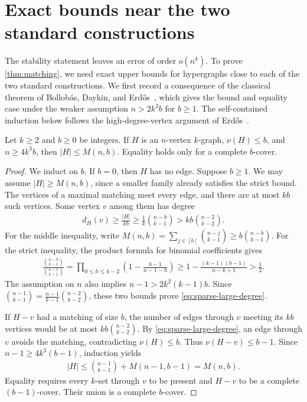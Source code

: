 \section{Exact bounds near the two standard constructions}\label{sec:exact}

The stability statement leaves an error of order $o(n^k)$. To prove \cref{thm:matching}, we need exact upper bounds for hypergraphs close to each of the two standard constructions. We first record a consequence of the classical theorem of Bollob\'as, Daykin, and Erd\H{o}s~\cite[Theorem 1]{BDE1976}, which gives the bound and equality case under the weaker assumption $n>2k^3b$ for $b\ge1$. The self-contained induction below follows the high-degree-vertex argument of Erd\H{o}s~\cite[pp.~94--95]{Erdos1965}.

\begin{lemma}\label{lem:sparse-matching}
Let $k\ge2$ and $b\ge0$ be integers. If $H$ is an $n$-vertex $k$-graph, $\nu(H)\le b$, and $n\ge4k^3b$, then $|H|\le M(n,b)$. Equality holds only for a complete $b$-cover.
\end{lemma}
\begin{proof}
We induct on $b$. If $b=0$, then $H$ has no edge. Suppose $b\ge1$. We may assume $|H|\ge M(n,b)$, since a smaller family already satisfies the strict bound. The vertices of a maximal matching meet every edge, and there are at most $kb$ such vertices. Some vertex $v$ among them has degree
\begin{align}
d_H(v)\ge\frac{|H|}{kb}
\ge\frac1k\binom{n-b}{k-1}
>kb\binom{n-2}{k-2}.
\label{eq:sparse-large-degree}
\end{align}
For the middle inequality, write $M(n,b)=\sum_{j\in[b]}\binom{n-j}{k-1}\ge b\binom{n-b}{k-1}$. For the strict inequality, the product formula for binomial coefficients gives
\begin{align*}
\frac{\binom{n-b}{k-1}}{\binom{n-1}{k-1}}
=\prod_{0\le h\le k-2}\left(1-\frac{b-1}{n-1-h}\right)
\ge1-\frac{(k-1)(b-1)}{n-k+1}>\frac12.
\end{align*}
The assumption on $n$ also implies $n-1>2k^2(k-1)b$. Since $\binom{n-1}{k-1}=\frac{n-1}{k-1}\binom{n-2}{k-2}$, these two bounds prove \cref{eq:sparse-large-degree}.

If $H-v$ had a matching of size $b$, the number of edges through $v$ meeting its $kb$ vertices would be at most $kb\binom{n-2}{k-2}$. By \cref{eq:sparse-large-degree}, an edge through $v$ avoids the matching, contradicting $\nu(H)\le b$. Thus $\nu(H-v)\le b-1$. Since $n-1\ge4k^3(b-1)$, induction yields
\begin{align*}
|H|\le\binom{n-1}{k-1}+M(n-1,b-1)=M(n,b).
\end{align*}
Equality requires every $k$-set through $v$ to be present and $H-v$ to be a complete $(b-1)$-cover. Their union is a complete $b$-cover.
\end{proof}

